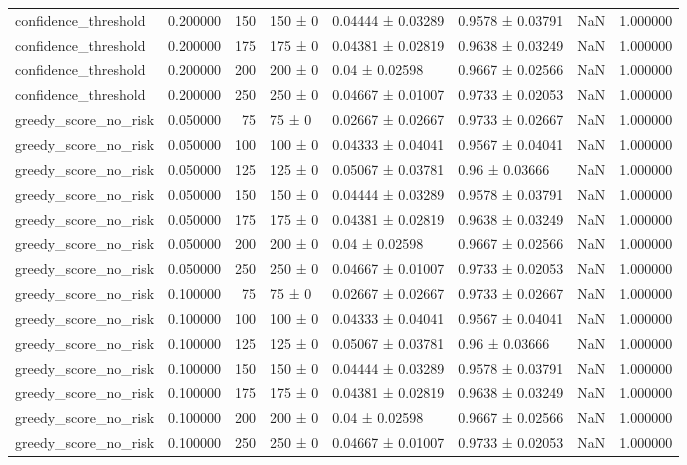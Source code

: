 \begin{tabular}{lrrllllr}
confidence_threshold & 0.200000 & 150 & 150 ± 0 & 0.04444 ± 0.03289 & 0.9578 ± 0.03791 & NaN & 1.000000 \\
confidence_threshold & 0.200000 & 175 & 175 ± 0 & 0.04381 ± 0.02819 & 0.9638 ± 0.03249 & NaN & 1.000000 \\
confidence_threshold & 0.200000 & 200 & 200 ± 0 & 0.04 ± 0.02598 & 0.9667 ± 0.02566 & NaN & 1.000000 \\
confidence_threshold & 0.200000 & 250 & 250 ± 0 & 0.04667 ± 0.01007 & 0.9733 ± 0.02053 & NaN & 1.000000 \\
greedy_score_no_risk & 0.050000 & 75 & 75 ± 0 & 0.02667 ± 0.02667 & 0.9733 ± 0.02667 & NaN & 1.000000 \\
greedy_score_no_risk & 0.050000 & 100 & 100 ± 0 & 0.04333 ± 0.04041 & 0.9567 ± 0.04041 & NaN & 1.000000 \\
greedy_score_no_risk & 0.050000 & 125 & 125 ± 0 & 0.05067 ± 0.03781 & 0.96 ± 0.03666 & NaN & 1.000000 \\
greedy_score_no_risk & 0.050000 & 150 & 150 ± 0 & 0.04444 ± 0.03289 & 0.9578 ± 0.03791 & NaN & 1.000000 \\
greedy_score_no_risk & 0.050000 & 175 & 175 ± 0 & 0.04381 ± 0.02819 & 0.9638 ± 0.03249 & NaN & 1.000000 \\
greedy_score_no_risk & 0.050000 & 200 & 200 ± 0 & 0.04 ± 0.02598 & 0.9667 ± 0.02566 & NaN & 1.000000 \\
greedy_score_no_risk & 0.050000 & 250 & 250 ± 0 & 0.04667 ± 0.01007 & 0.9733 ± 0.02053 & NaN & 1.000000 \\
greedy_score_no_risk & 0.100000 & 75 & 75 ± 0 & 0.02667 ± 0.02667 & 0.9733 ± 0.02667 & NaN & 1.000000 \\
greedy_score_no_risk & 0.100000 & 100 & 100 ± 0 & 0.04333 ± 0.04041 & 0.9567 ± 0.04041 & NaN & 1.000000 \\
greedy_score_no_risk & 0.100000 & 125 & 125 ± 0 & 0.05067 ± 0.03781 & 0.96 ± 0.03666 & NaN & 1.000000 \\
greedy_score_no_risk & 0.100000 & 150 & 150 ± 0 & 0.04444 ± 0.03289 & 0.9578 ± 0.03791 & NaN & 1.000000 \\
greedy_score_no_risk & 0.100000 & 175 & 175 ± 0 & 0.04381 ± 0.02819 & 0.9638 ± 0.03249 & NaN & 1.000000 \\
greedy_score_no_risk & 0.100000 & 200 & 200 ± 0 & 0.04 ± 0.02598 & 0.9667 ± 0.02566 & NaN & 1.000000 \\
greedy_score_no_risk & 0.100000 & 250 & 250 ± 0 & 0.04667 ± 0.01007 & 0.9733 ± 0.02053 & NaN & 1.000000 \\

\end{tabular}

